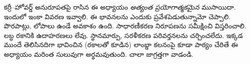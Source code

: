 \documentclass[../../../include/open-logic-chapter]{subfiles}
\begin{document}

\begin{editorial}
  కర్రీ--హోవర్డ్ అనురూపతపై రాసిన ఈ అధ్యాయం \emph{అత్యంత ప్రయోగాత్మకమైన} ముసాయిదా. ఇందులో ఇంకా వివరణ ఇవ్వాలి. ఈ భావనలను ఎందుకు ప్రవేశపెడుతున్నామో చెప్పాలి. పొరపాట్లు, లోపాలు ఉండే అవకాశం ఉంది. సాధారణీకరణ నిరూపణను సమీక్షించి విస్తరించాలి. లబ్ధ రకానికి ఉదాహరణలు లేవు. స్థానమార్పు, సరళీకరణ పరివర్తనలను చర్చించలేదు. ఇక్కడ ముందే తెలిసినదిగా భావించిన (రకాలతో కూడిన) లాంబ్డా కలనంపై కూడా పాఠ్యం చేరితే ఈ అధ్యాయం మరింత సులువుగా అర్థమవుతుంది. చాలా జాగ్రత్తగా వాడండి.
\end{editorial}


\OLEndChapterHook
\end{document}
